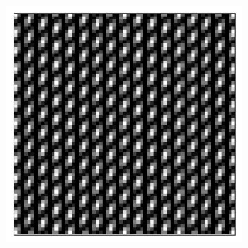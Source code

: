 \begin{figure}[h]
\begin{subfigure}[t]{0.3\textwidth}
		\caption{}
		\label{fig:fringes_2}
	\end{subfigure}
	\begin{subfigure}[t]{0.3\textwidth}
		\centering
		\includegraphics[width=\linewidth]{images/fringes_moire_kx_16_and_12_ky_0_and_12.png}
		\caption{}
		\label{fig:fringes_moire}
	\end{subfigure}
	

\end{figure}
